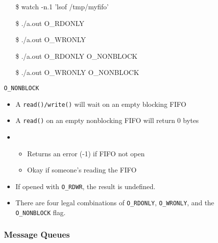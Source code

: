 \begin{frame}{}{}
  {\ttfamily
    \begin{itemize}
    \item[\$] watch -n.1 'lsof /tmp/myfifo'
    \item[\$] ./a.out O\_RDONLY
    \item[\$] ./a.out O\_WRONLY
    \item[\$] ./a.out O\_RDONLY O\_NONBLOCK
    \item[\$] ./a.out O\_WRONLY O\_NONBLOCK
    \end{itemize}}
  \begin{block}{\texttt{O\_NONBLOCK}}
    \begin{itemize}
    \item A \texttt{read()/write()} will wait on an empty blocking FIFO
    \item A \texttt{read()} on an empty nonblocking FIFO will return 0 bytes
    \item {}
      \begin{itemize}
      \item Returns an error (-1) if FIFO not open
      \item Okay if someone's reading the FIFO
      \end{itemize}
    \item If opened with \texttt{O\_RDWR}, the result is undefined.  
    \end{itemize}
  \end{block}
\end{frame}

\begin{itemize}
\item There are four legal combinations of \texttt{O\_RDONLY}, \texttt{O\_WRONLY}, and the
  \texttt{O\_NONBLOCK} flag. 
\end{itemize}
\begin{longlisting}
\end{longlisting}

\subsubsection{Message Queues}
\label{sec:message-queues}

